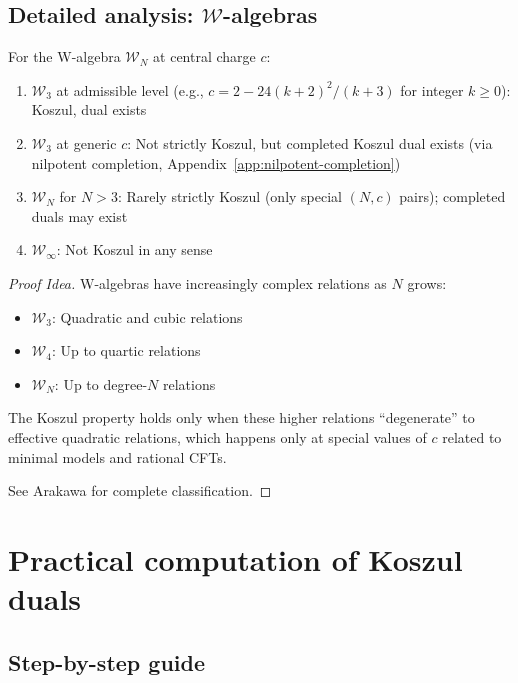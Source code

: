\subsection{Detailed analysis: $\mathcal{W}$-algebras}

\begin{proposition}\label{prop:w-algebra-koszul}
For the W-algebra $\mathcal{W}_N$ at central charge $c$:
\begin{enumerate}
\item $\mathcal{W}_3$ at admissible level (e.g., $c = 2 - 24(k+2)^2/(k+3)$ for integer $k \geq 0$): Koszul, dual exists
\item $\mathcal{W}_3$ at generic $c$: Not strictly Koszul, but completed Koszul dual exists (via nilpotent completion, Appendix~\ref{app:nilpotent-completion})
\item $\mathcal{W}_N$ for $N > 3$: Rarely strictly Koszul (only special $(N, c)$ pairs); completed duals may exist
\item $\mathcal{W}_\infty$: Not Koszul in any sense
\end{enumerate}
\end{proposition}

\begin{proof}[Proof Idea]
W-algebras have increasingly complex relations as $N$ grows:
\begin{itemize}
\item $\mathcal{W}_3$: Quadratic and cubic relations
\item $\mathcal{W}_4$: Up to quartic relations
\item $\mathcal{W}_N$: Up to degree-$N$ relations
\end{itemize}

The Koszul property holds only when these higher relations ``degenerate'' to effective 
quadratic relations, which happens only at special values of $c$ related to minimal 
models and rational CFTs.

See Arakawa \cite{Ara07} for complete classification.
\end{proof}


\section{Practical computation of Koszul duals}
\label{sec:practical-computation}

\subsection{Step-by-step guide}


